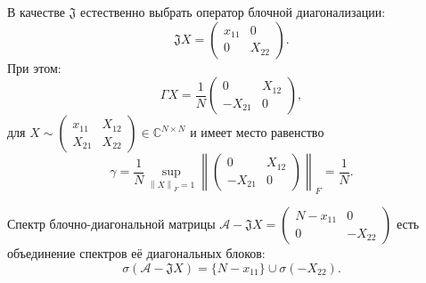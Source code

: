 \begin{ksvlem}
    В качестве \( \mathfrak{J} \)
        естественно выбрать оператор блочной диагонализации:
    \[
        \mathfrak{J} X = \begin{pmatrix} x_{11} & 0 \\ 0 & X_{22} \end{pmatrix}. \]
    При этом:
    \[
        \Gamma X = \frac{1}{N} \begin{pmatrix} 0 & X_{12} \\ -X_{21} & 0 \end{pmatrix}, \]
        для \( X\sim \begin{pmatrix}x_{11} & X_{12} \\ X_{21} & X_{22}\end{pmatrix} \in \mathbb{C}^{N{\times}N} \)
    и имеет место равенство
    \[
        \gamma = \frac1N
                \sup_{{\left\|X\right\|}_{F}=1}{\left\|\begin{pmatrix}0 & X_{12} \\ -X_{21} & 0\end{pmatrix}\right\|}_{F}
                = \frac1N. \]

\end{ksvlem}
\begin{ksvcrl}
    Спектр блочно-диагональной матрицы
    \( \mathcal{A} - \mathfrak{J}X = \begin{pmatrix} N - x_{11} & 0 \\ 0 & -X_{22} \end{pmatrix} \)
    есть объединение спектров е\"е диагональных блоков:
    \[
        \sigma(\mathcal{A} - \mathfrak{J} X) = \{ N - x_{11} \} \cup \sigma(-X_{22}). \]
\end{ksvcrl}
